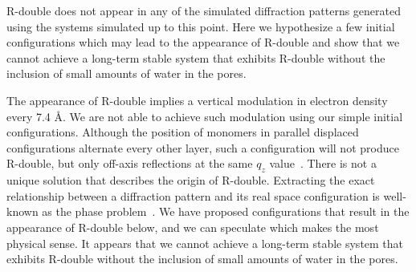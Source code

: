 \documentclass[journal=jpcbfk,manuscript=article]{achemso}
\begin{document}
  R-double does not appear in any of the simulated diffraction patterns
  generated using the systems simulated up to this point. Here we hypothesize a
  few initial configurations which may lead to the appearance of R-double and
  show that we cannot achieve a long-term stable system that exhibits R-double
  without the inclusion of small amounts of water in the pores.
  
  
  The appearance of R-double implies a vertical modulation in electron density
  every 7.4 \AA. We are not able to achieve such modulation using our simple
  initial configurations. Although the position of monomers in parallel displaced
  configurations alternate every other layer, such a configuration will not
  produce R-double, but only off-axis reflections at the same $q_z$
  value~\cite{harburn_atlas_1975}. There is not a unique solution that describes
  the origin of R-double. Extracting the exact relationship between a diffraction
  pattern and its real space configuration is well-known as the phase
  problem~\cite{taylor_phase_2003}. We have proposed configurations that
  result in the appearance of R-double below, and we can speculate which makes
  the most physical sense. It appears that we cannot achieve a long-term stable
  system that exhibits R-double without the inclusion of small amounts of water
  in the pores.
  
 
\end{document}
